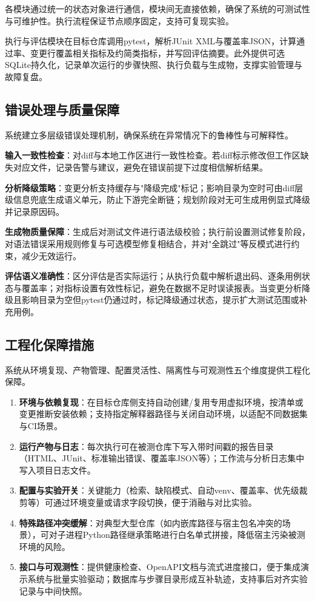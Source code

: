 各模块通过统一的状态对象进行通信，模块间无直接依赖，确保了系统的可测试性与可维护性。执行流程保证节点顺序固定，支持可复现实验。

执行与评估模块在目标仓库调用pytest，解析JUnit XML与覆盖率JSON，计算通过率、变更行覆盖相关指标及约简类指标，并写回评估摘要。此外提供可选SQLite持久化，记录单次运行的步骤快照、执行负载与生成物，支撑实验管理与故障复盘。

\subsection{错误处理与质量保障}\label{sec:error_handling}

系统建立多层级错误处理机制，确保系统在异常情况下的鲁棒性与可解释性。

\textbf{输入一致性检查}：对diff与本地工作区进行一致性检查。若diff标示修改但工作区缺失对应文件，记录告警与建议，避免在错误前提下过度相信解析结果。

\textbf{分析降级策略}：变更分析支持缓存与"降级完成"标记；影响目录为空时可由diff层级信息兜底生成语义单元，防止下游完全断链；规划阶段对无可生成用例显式降级并记录原因码。

\textbf{生成物质量保障}：生成后对测试文件进行语法级校验；执行前设置测试修复阶段，对语法错误采用规则修复与可选模型修复相结合，并对"全跳过"等反模式进行约束，减少无效运行。

\textbf{评估语义准确性}：区分评估是否实际运行；从执行负载中解析退出码、逐条用例状态与覆盖率；对指标设置有效性标记，避免在数据不足时误读报表。当变更分析降级且影响目录为空但pytest仍通过时，标记降级通过状态，提示扩大测试范围或补充用例。

\subsection{工程化保障措施}\label{sec:engineering_guarantees}

系统从环境复现、产物管理、配置灵活性、隔离性与可观测性五个维度提供工程化保障。

\begin{enumerate}
\item \textbf{环境与依赖复现}：在目标仓库侧支持自动创建/复用专用虚拟环境，按清单或变更推断安装依赖；支持指定解释器路径与关闭自动环境，以适配不同数据集与CI场景。
\item \textbf{运行产物与日志}：每次执行可在被测仓库下写入带时间戳的报告目录（HTML、JUnit、标准输出错误、覆盖率JSON等）；工作流与分析日志集中写入项目日志文件。
\item \textbf{配置与实验开关}：关键能力（检索、缺陷模式、自动venv、覆盖率、优先级裁剪等）可通过环境变量或请求字段切换，便于消融与对比实验。
\item \textbf{特殊路径冲突缓解}：对典型大型仓库（如内嵌库路径与宿主包名冲突的场景），可对子进程Python路径继承策略进行白名单式拼接，降低宿主污染被测环境的风险。
\item \textbf{接口与可观测性}：提供健康检查、OpenAPI文档与流式进度接口，便于集成演示系统与批量实验驱动；数据库与步骤目录形成互补轨迹，支持事后对齐实验记录与中间快照。
\end{enumerate}

